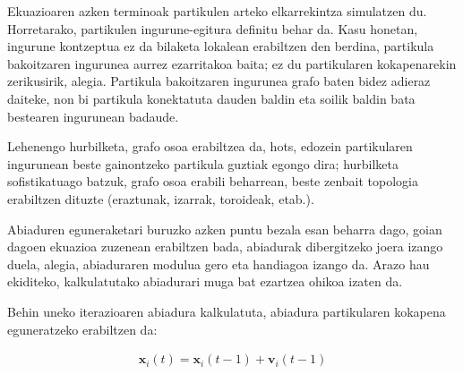 \documentclass[eu]{ifirak}\usepackage[]{graphicx}\usepackage[]{color}
\begin{document}
Ekuazioaren azken terminoak partikulen arteko elkarrekintza simulatzen du. Horretarako, partikulen ingurune-egitura definitu behar da. Kasu honetan, ingurune kontzeptua ez da bilaketa lokalean erabiltzen den berdina, partikula bakoitzaren ingurunea aurrez ezarritakoa baita; ez du partikularen kokapenarekin zerikusirik, alegia. Partikula bakoitzaren ingurunea grafo baten bidez adieraz daiteke, non bi partikula konektatuta dauden baldin eta soilik baldin bata bestearen ingurunean badaude. 

Lehenengo hurbilketa, grafo osoa erabiltzea da, hots, edozein partikularen ingurunean beste gainontzeko partikula guztiak egongo dira; hurbilketa sofistikatuago batzuk, grafo osoa erabili beharrean, beste zenbait topologia erabiltzen dituzte (eraztunak, izarrak, toroideak, etab.).

Abiaduren eguneraketari buruzko azken puntu bezala esan beharra dago, goian dagoen ekuazioa zuzenean erabiltzen bada, abiadurak dibergitzeko joera izango duela, alegia, abiaduraren modulua gero eta handiagoa izango da. Arazo hau ekiditeko, kalkulatutako abiadurari muga bat ezartzea ohikoa izaten da.

Behin uneko iterazioaren abiadura kalkulatuta, abiadura partikularen kokapena eguneratzeko erabiltzen da:

\begin{align*}
\mathbf{x}_i(t) = \mathbf{x}_i(t-1) + \mathbf{v}_i(t-1)
\end{align*}
\end{document}
